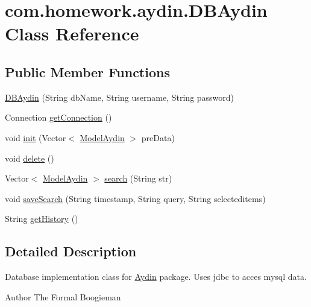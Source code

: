 \hypertarget{classcom_1_1homework_1_1aydin_1_1_d_b_aydin}{}\section{com.\+homework.\+aydin.\+D\+B\+Aydin Class Reference}
\label{classcom_1_1homework_1_1aydin_1_1_d_b_aydin}
\subsection*{Public Member Functions}
\begin{DoxyCompactItemize}
\item 
\hyperlink{classcom_1_1homework_1_1aydin_1_1_d_b_aydin_a153864fa5798ba91fba168de198a797d}{D\+B\+Aydin} (String db\+Name, String username, String password)
\item 
Connection \hyperlink{classcom_1_1homework_1_1aydin_1_1_d_b_aydin_aa54ee4985e5a6b99af7606f829d438a9}{get\+Connection} ()
\item 
void \hyperlink{classcom_1_1homework_1_1aydin_1_1_d_b_aydin_a285721a7c0b3ed8dbfc2086cf47e82b5}{init} (Vector$<$ \hyperlink{classcom_1_1homework_1_1aydin_1_1_model_aydin}{Model\+Aydin} $>$ pre\+Data)
\item 
void \hyperlink{classcom_1_1homework_1_1aydin_1_1_d_b_aydin_a9aba7b406829dd700791d0c4399926be}{delete} ()
\item 
Vector$<$ \hyperlink{classcom_1_1homework_1_1aydin_1_1_model_aydin}{Model\+Aydin} $>$ \hyperlink{classcom_1_1homework_1_1aydin_1_1_d_b_aydin_a84b7ed5caff4edd908bae8dcd25710fa}{search} (String str)
\item 
void \hyperlink{classcom_1_1homework_1_1aydin_1_1_d_b_aydin_a23c6fc87afe0b7b3679a9f50bec53299}{save\+Search} (String timestamp, String query, String selecteditems)
\item 
String \hyperlink{classcom_1_1homework_1_1aydin_1_1_d_b_aydin_a1a347fce1988d8c112d148ea817ff2d6}{get\+History} ()
\end{DoxyCompactItemize}


\subsection{Detailed Description}
Database implementation class for \hyperlink{classcom_1_1homework_1_1aydin_1_1_aydin}{Aydin} package. Uses jdbc to acces mysql data. \begin{DoxyAuthor}{Author}
The Formal Boogieman 
\end{DoxyAuthor}


